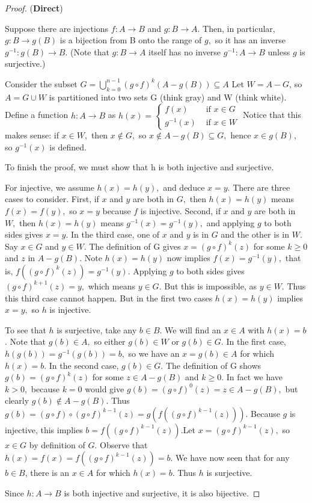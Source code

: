 \documentclass[12pt]{book}
\theoremstyle{definition}\newtheorem{dfn}{Définition}[chapter]
\theoremstyle{plain}\newtheorem{thm}{Théorème}[chapter]
\theoremstyle{plain}\newtheorem{prp}{Proposition}[chapter]
\theoremstyle{plain}\newtheorem{lem}{\bf Lemme}[chapter]
\theoremstyle{plain}\newtheorem{axm}{\bf Axiome}[chapter]
\theoremstyle{plain}\newtheorem{lmm}{\bf Lemme}[chapter]
\theoremstyle{plain}\newtheorem{exm}{\bf Example}[chapter]
\theoremstyle{plain}\newtheorem{cor}{\bf Corollaire}[chapter]
\theoremstyle{remark}\newtheorem{rem}{Remarque}[chapter]
\begin{document}
 \begin{proof}
({\bf Direct})

Suppose there are injections $f: A \rightarrow B$ and $g: B \rightarrow A$. Then, in particular, $g: B \rightarrow g(B)$ is a bijection from B onto the range of $g,$ so it has an inverse $g^{-1}: g(B) \rightarrow B$. (Note that $g: B \rightarrow A$ itself has no inverse $g^{-1}: A \rightarrow B$ unless $g$ is surjective.)

Consider the subset $G=\bigcup\limits_{k=0}^{n-1}(g \circ f)^{k}(A-g(B)) \subseteq A$
Let $W=A-G$, so $A=G \cup W$ is partitioned into two sets G (think gray) and W (think white). Define a function $h: A \rightarrow B$ as
$h(x)=\left\{\begin{array}{cl}f(x) & \text { if } x \in G \\ g^{-1}(x) & \text { if } x \in W\end{array}\right.$
Notice that this makes sense: if $x \in W,$ then $x \notin G,$ so $x \notin A-g(B) \subseteq G,$ hence $x \in g(B),$ so $g^{-1}(x)$ is defined.

To finish the proof, we must show that $\mathrm{h}$ is both injective and surjective.

For injective, we assume $h(x)=h(y),$ and deduce $x=y .$ There are three cases to consider. First, if $x$ and $y$ are both in $G,$ then $h(x)=h(y)$ means $f(x)=f(y),$ so $x=y$ because $f$ is injective. Second, if $x$ and $y$ are both in $W,$ then $h(x)=h(y)$ means $g^{-1}(x)=g^{-1}(y),$ and applying $g$ to both sides gives $x=y$. In the third case, one of $x$ and $y$ is in $G$ and the other is in $W$. Say $x \in G$ and $y \in W$. The definition of G gives $x=(g \circ f)^{k}(z)$ for some $k \geq 0$ and $z$ in $A-g(B)$. Note $h(x)=h(y)$ now implies $f(x)=g^{-1}(y),$ that is, $f\left((g \circ f)^{k}(z)\right)=g^{-1}(y)$. Applying $g$ to both sides gives $(g \circ f)^{k+1}(z)=y,$ which means $y \in G .$ But this is impossible, as $y \in W$. Thus this third case cannot happen. But in the first two cases $h(x)=h(y)$ implies $x=y,$ so $h$ is injective.

To see that $h$ is surjective, take any $b \in B$. We will find an $x \in A$ with $h(x)=b$. Note that $g(b) \in A,$ so either $g(b) \in W$ or $g(b) \in G$. In the first case, $h(g(b))=g^{-1}(g(b))=b,$ so we have an $x=g(b) \in A$ for which $h(x)=b$. In the second case, $g(b) \in G .$ The definition of G shows $g(b)=(g \circ f)^{k}(z)$
for some $z \in A-g(B)$ and $k \geq 0$. In fact we have $k>0,$ because $k=0$ would give $g(b)=(g \circ f)^{0}(z)=z \in A-g(B),$ but clearly $g(b) \notin A-g(B)$. Thus $g(b)=(g \circ f) \circ(g \circ f)^{k-1}(z)=g\left(f\left((g \circ f)^{k-1}(z)\right)\right) .$ Because $g$ is injective, this implies $b=f\left((g \circ f)^{k-1}(z)\right).$Let $x=(g \circ f)^{k-1}(z),$ so $x \in G$ by definition of $G$. Observe that $h(x)=f(x)=f\left((g \circ f)^{k-1}(z)\right)=b$. We have now seen that for any $b \in B$, there is an $x \in A$ for which $h(x)=b$. Thus $h$ is surjective.

Since $h: A \rightarrow B$ is both injective and surjective, it is also bijective.

 \end{proof} 
\end{document}
